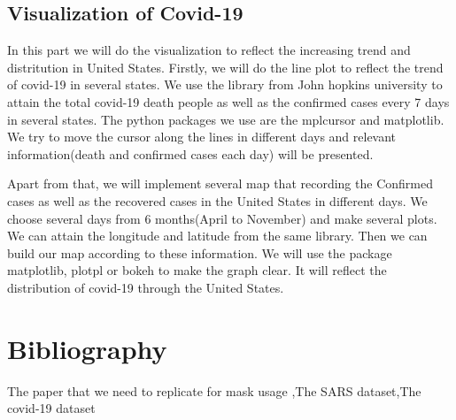 \documentclass{article}
\begin{document}
\subsection{Visualization of Covid-19}
In this part we will do the visualization to reflect the increasing trend and distritution in United States.
Firstly, we will do the line plot to reflect the trend of covid-19 in several states. We use the library from John hopkins university to attain the total covid-19 death people as well as the confirmed cases every 7 days in several states. The python packages we use are the mplcursor and matplotlib. We try to move the cursor along the lines in different days and relevant information(death and confirmed cases each day) will be presented.

Apart from that, we will implement several map that recording the Confirmed cases as well as the recovered cases in the United States in different days. We choose several days from 6 months(April to November) and make several plots. We can attain the longitude and latitude from the same library. Then we can build our map according to these information. We will use the package matplotlib, plotpl or bokeh to make the graph clear. It will reflect the distribution of covid-19 through the United States.

\section{Bibliography}
The paper that we need to replicate for mask usage \cite{Steff2020mask},The SARS dataset\cite{SARSsource},The covid-19 dataset\cite{Johnhopkins}

\printbibliography
\end{document}
